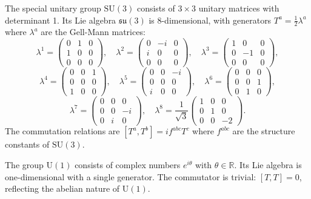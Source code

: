 \begin{example}[$\mathrm{SU}(3)$]
The special unitary group $\mathrm{SU}(3)$ consists of $3 \times 3$ unitary matrices with determinant 1. Its Lie algebra $\mathfrak{su}(3)$ is 8-dimensional, with generators $T^a = \frac{1}{2}\lambda^a$ where $\lambda^a$ are the Gell-Mann matrices:
\[
\lambda^1 = \begin{pmatrix} 0 & 1 & 0 \\ 1 & 0 & 0 \\ 0 & 0 & 0 \end{pmatrix}, \quad
\lambda^2 = \begin{pmatrix} 0 & -i & 0 \\ i & 0 & 0 \\ 0 & 0 & 0 \end{pmatrix}, \quad
\lambda^3 = \begin{pmatrix} 1 & 0 & 0 \\ 0 & -1 & 0 \\ 0 & 0 & 0 \end{pmatrix},
\]
\[
\lambda^4 = \begin{pmatrix} 0 & 0 & 1 \\ 0 & 0 & 0 \\ 1 & 0 & 0 \end{pmatrix}, \quad
\lambda^5 = \begin{pmatrix} 0 & 0 & -i \\ 0 & 0 & 0 \\ i & 0 & 0 \end{pmatrix}, \quad
\lambda^6 = \begin{pmatrix} 0 & 0 & 0 \\ 0 & 0 & 1 \\ 0 & 1 & 0 \end{pmatrix},
\]
\[
\lambda^7 = \begin{pmatrix} 0 & 0 & 0 \\ 0 & 0 & -i \\ 0 & i & 0 \end{pmatrix}, \quad
\lambda^8 = \frac{1}{\sqrt{3}}\begin{pmatrix} 1 & 0 & 0 \\ 0 & 1 & 0 \\ 0 & 0 & -2 \end{pmatrix}.
\]
The commutation relations are $[T^a, T^b] = if^{abc} T^c$ where $f^{abc}$ are the structure constants of $\mathrm{SU}(3)$.
\end{example}

\begin{example}[$\mathrm{U}(1)$]
The group $\mathrm{U}(1)$ consists of complex numbers $e^{i\theta}$ with $\theta \in \mathbb{R}$. Its Lie algebra is one-dimensional with a single generator. The commutator is trivial: $[T, T] = 0$, reflecting the abelian nature of $\mathrm{U}(1)$.
\end{example}

